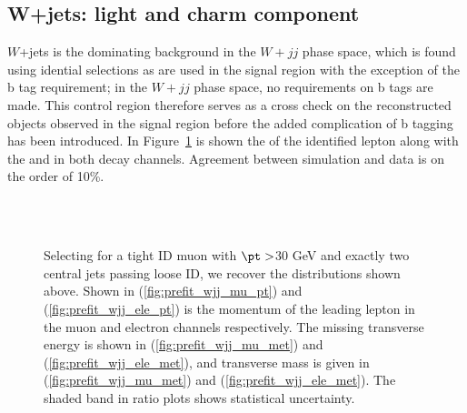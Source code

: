 \subsection{W+jets: light and charm component}

$W$+jets is the dominating background in the $W+jj$ phase space,
 which is found using idential selections as are used in 
 the signal region with the exception of the b tag requirement;
 in the $W+jj$ phase space, no requirements on b tags are made.
This control region therefore serves as a cross check on the 
 reconstructed objects observed in the signal region before
 the added complication of b tagging has been introduced. 
In Figure~\ref{fig:wjj_plots} is shown the \pt 
 of the identified lepton along with the \met and \mt
 in both decay channels.
Agreement between simulation and data is on the order of 10\%.

\begin{figure}
 \center
 \\
 \\
 \caption{
  Selecting for a tight ID muon with $\pt>$30 GeV and exactly two central jets passing loose ID,
   we recover the distributions shown above. 
  Shown in (\ref{fig:prefit_wjj_mu_pt}) and (\ref{fig:prefit_wjj_ele_pt})
   is the momentum of the leading lepton in the muon and electron channels respectively.
  The missing transverse energy is shown in (\ref{fig:prefit_wjj_mu_met}) and (\ref{fig:prefit_wjj_ele_met}),
  and transverse mass is given in (\ref{fig:prefit_wjj_mu_met}) and (\ref{fig:prefit_wjj_ele_met}).
  The shaded band in ratio plots shows statistical uncertainty. 
 } 
    \label{fig:wjj_plots}
\end{figure}

